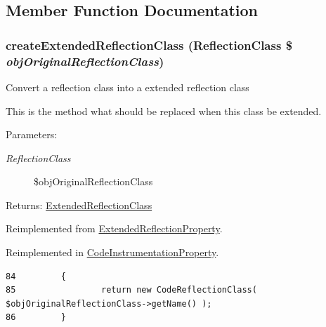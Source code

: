 \subsection{Member Function Documentation}
\hypertarget{class_code_reflection_property_6b56ec198bc6a5b5a72076e4e7c19e29}{
\subsubsection[{createExtendedReflectionClass}]{\setlength{\rightskip}{0pt plus 5cm}createExtendedReflectionClass (ReflectionClass \$ {\em objOriginalReflectionClass})}}
\label{class_code_reflection_property_6b56ec198bc6a5b5a72076e4e7c19e29}


Convert a reflection class into a extended reflection class

This is the method what should be replaced when this class be extended.

\begin{Desc}
\item[Parameters:]
\begin{description}
\item[{\em ReflectionClass}]\$objOriginalReflectionClass \end{description}
\end{Desc}
\begin{Desc}
\item[Returns:]\hyperlink{class_extended_reflection_class}{ExtendedReflectionClass} \end{Desc}


Reimplemented from \hyperlink{class_extended_reflection_property_6b56ec198bc6a5b5a72076e4e7c19e29}{ExtendedReflectionProperty}.

Reimplemented in \hyperlink{class_code_instrumentation_property_6b56ec198bc6a5b5a72076e4e7c19e29}{CodeInstrumentationProperty}.

\begin{Code}\begin{verbatim}84         {
85                 return new CodeReflectionClass( $objOriginalReflectionClass->getName() );
86         }
\end{verbatim}
\end{Code}


